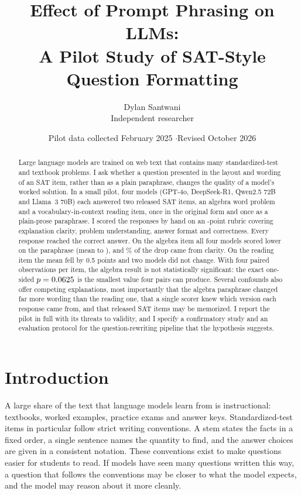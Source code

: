 \documentclass[11pt]{article}
\title{\textbf{Effect of Prompt Phrasing on LLMs:\\A Pilot Study of SAT-Style Question Formatting}}
\author{Dylan Santwani\\[2pt]\normalsize Independent researcher}
\date{\normalsize Pilot data collected February 2025 \quad$\cdot$\quad Revised October 2026}
\begin{document}
\maketitle

\begin{abstract}
\noindent
Large language models are trained on web text that contains many standardized-test and textbook problems. I ask whether a question presented in the layout and wording of an SAT item, rather than as a plain paraphrase, changes the quality of a model's worked solution. In a small pilot, four models (GPT-4o, DeepSeek-R1, Qwen2.5 72B and Llama~3 70B) each answered two released SAT items, an algebra word problem and a vocabulary-in-context reading item, once in the original form and once as a plain-prose paraphrase. I scored the \NumResponses{} responses by hand on an \TotalMax-point rubric covering explanation clarity, problem understanding, answer format and correctness. Every response reached the correct answer. On the algebra item all four models scored lower on the paraphrase (mean \QOneMeanF{} to \QOneMeanU{}), and \QOneClarityShare\% of the drop came from clarity. On the reading item the mean fell by 0.5 points and two models did not change. With four paired observations per item, the algebra result is not statistically significant: the exact one-sided $p = 0.0625$ is the smallest value four pairs can produce. Several confounds also offer competing explanations, most importantly that the algebra paraphrase changed far more wording than the reading one, that a single scorer knew which version each response came from, and that released SAT items may be memorized. I report the pilot in full with its threats to validity, and I specify a confirmatory study and an evaluation protocol for the question-rewriting pipeline that the hypothesis suggests.
\end{abstract}

\section{Introduction}

A large share of the text that language models learn from is instructional: textbooks, worked examples, practice exams and answer keys. Standardized-test items in particular follow strict writing conventions. A stem states the facts in a fixed order, a single sentence names the quantity to find, and the answer choices are given in a consistent notation. These conventions exist to make questions easier for students to read. If models have seen many questions written this way, a question that follows the conventions may be closer to what the model expects, and the model may reason about it more cleanly.
\end{document}

